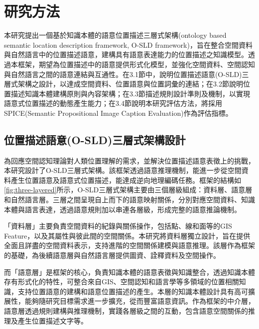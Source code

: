 
\chapter{研究方法}

本研究提出一個基於知識本體的語意位置描述三層式架構(ontology based semantic location description framework, O-SLD framework)，旨在整合空間資料與自然語言中的位置描述語意，建構具有語意表達能力的位置描述之知識模型。透過本框架，期望為位置描述中的語意提供形式化模型，並強化空間資料、空間認知與自然語言之間的語意連結與互通性。在3.1節中，說明位置描述語意(O-SLD)三層式架構之設計，以達成空間資料、位置語意與位置詞彙的連結；在3.2節說明位置描述知識本體建構原則與內容架構；在3.3節描述規則設計準則及機制，以實現語意式位置描述的動態產生能力；在3.4節說明本研究評估方法，將採用SPICE(Semantic Propositional Image Caption Evaluation)作為評估指標。

\section{位置描述語意(O-SLD)三層式架構設計}

為回應空間認知理論對人類位置理解的需求，並解決位置描述語意表徵上的挑戰，本研究設計了O-SLD三層式架構。該框架透過語意推理機制，能進一步從空間資料產生位置語意及語意式位置描述，能達成逆向地理編碼任務。框架的結構如\ref{fig:three-layered}所示，O-SLD三層式架構主要由三個層級組成：資料層、語意層和自然語言層。三層之間呈現自上而下的語意映射關係，分別對應空間資料、知識本體與語言表達，透過語意規則加以串連各層級，形成完整的語意推論機制。


「資料層」主要負責空間資料的紀錄與關係操作，包括點、線和面等的GIS Feature，以及其屬性與彼此間的空間關係。本研究將資料層獨立設計，旨在提供全面且詳盡的空間資料表示，支持進階的空間關係建模與語意推理。該層作為框架的基礎，為後續語意層與自然語言層提供圖資、詮釋資料及空間操作。

而「語意層」是框架的核心，負責知識本體的語意表徵與知識整合，透過知識本體存有形式化的特性，可整合來自GIS、空間認知和語言學等多領域的位置相關知識，支持位置語意的建構和語意位置描述的產生。本層的知識本體設計具有高可擴展性，能夠隨研究目標需求進一步擴充，從而豐富語意資訊。作為框架的中介層，語意層透過規則建構與推理機制，實踐各層級之間的互動，包含語意空間關係的推理及產生位置描述文字等。

